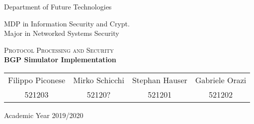 \pagestyle{plain}

\thispagestyle{empty}

\begin{center}
  \begin{figure}[h!]
    \centerline{}
  \end{figure}


  \LARGE{Department of Future Technologies}

  \vspace{1 cm}
  \Large{MDP in Information Security and Crypt.\\
  Major in Networked Systems Security}

  \vspace{2 cm}
  \vspace{1 cm}
  \Huge\textsc{Protocol Processing and Security\\}
  \vspace{1cm}
  \LARGE{\textbf{BGP Simulator Implementation}\\}


  \vspace{4 cm}
  \begin{tabular}{cccc}
    Filippo Piconese & Mirko Schicchi & Stephan Hauser & Gabriele Orazi\\
    521203 & 52120? & 521201 & 521202\\
  \end{tabular}

  \vfill

  {\Large{Academic Year 2019/2020}}
\end{center}
